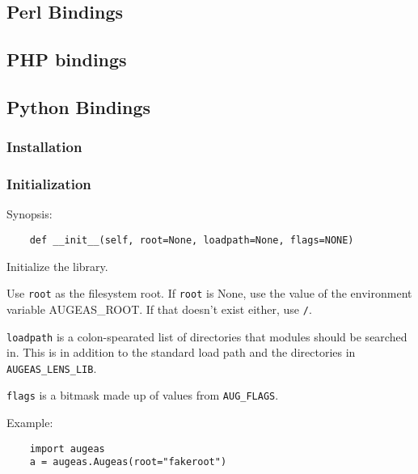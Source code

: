 
\subsection{Perl Bindings}


\subsection{PHP bindings}


\subsection{Python Bindings}


\subsubsection{Installation}

\subsubsection{Initialization}

Synopsis:

\begin{verbatim}
    def __init__(self, root=None, loadpath=None, flags=NONE)
\end{verbatim}

Initialize the library.

Use \verb!root! as the filesystem root. If \verb!root! is None, use the value of the environment variable AUGEAS\_ROOT. If that doesn't exist either, use \nolinkurl{/}.

\verb!loadpath! is a colon-spearated list of directories that modules should be searched in. This is in addition to the standard load path and the directories in \verb!AUGEAS_LENS_LIB!.

\verb!flags! is a bitmask made up of values from \verb!AUG_FLAGS!.

Example:

\begin{verbatim}
    import augeas
    a = augeas.Augeas(root="fakeroot")
\end{verbatim}

